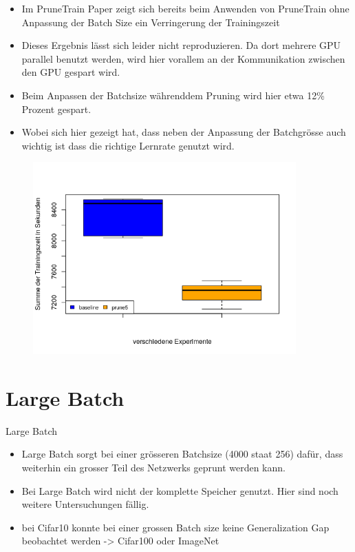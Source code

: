 \documentclass[10pt]{beamer}
\begin{document}
\begin{frame}{}
\begin{itemize}
 \item  Im PruneTrain Paper zeigt sich bereits beim Anwenden von PruneTrain ohne Anpassung der Batch Size ein Verringerung der Trainingszeit
 \item Dieses Ergebnis lässt sich leider nicht reproduzieren. Da dort mehrere GPU parallel benutzt werden, wird hier vorallem an der Kommunikation zwischen den GPU gespart wird. 
 \item Beim Anpassen der Batchsize währenddem Pruning wird hier etwa 12\% Prozent gespart.
 \item Wobei sich hier gezeigt hat, dass neben der Anpassung der Batchgrösse auch wichtig ist dass die richtige Lernrate genutzt wird.
\end{itemize}
\end{frame}


\begin{frame}{}
 \begin{figure}
 \includegraphics[width=0.9\textwidth]{grafik/pruneVsBaseline.png}
 \caption{}
\end{figure}
\end{frame}

\section{Large Batch}

\begin{frame}{Large Batch}
\begin{itemize}
 \item Large Batch sorgt bei einer grösseren Batchsize (4000 staat 256) dafür, dass weiterhin ein grosser Teil des Netzwerks geprunt werden kann.
 \item Bei Large Batch wird nicht der komplette Speicher genutzt. Hier sind noch weitere Untersuchungen fällig.
 \item bei Cifar10 konnte bei einer grossen Batch size keine Generalization Gap beobachtet werden -> Cifar100 oder ImageNet
\end{itemize}
\end{frame}
\end{document}
